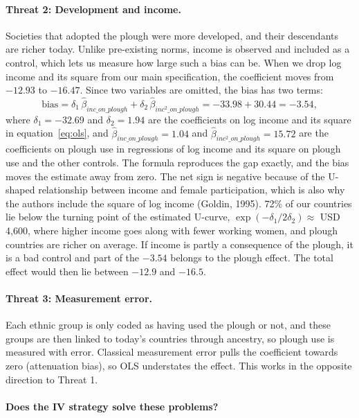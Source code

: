 \documentclass[12pt,a4paper]{article}
\begin{document}
\paragraph{Threat 2: Development and income.}

Societies that adopted the plough were more developed, and their descendants are richer today. Unlike pre-existing norms, income is observed and included as a control, which lets us measure how large such a bias can be. When we drop log income and its square from our main specification, the coefficient moves from $-12.93$ to $-16.47$. Since two variables are omitted, the bias has two terms:
\[
\text{bias} = \delta_1 \, \hat\beta_{inc\_on\_plough} + \delta_2 \, \hat\beta_{inc^2\_on\_plough} = -33.98 + 30.44 = -3.54 ,
\]
where $\delta_1 = -32.69$ and $\delta_2 = 1.94$ are the coefficients on log income and its square in equation~\eqref{eq:ols}, and $\hat\beta_{inc\_on\_plough} = 1.04$ and $\hat\beta_{inc^2\_on\_plough} = 15.72$ are the coefficients on plough use in regressions of log income and its square on plough use and the other controls. The formula reproduces the gap exactly, and the bias moves the estimate away from zero. The net sign is negative because of the U-shaped relationship between income and female participation, which is also why the authors include the square of log income (Goldin, 1995). 72\% of our countries lie below the turning point of the estimated U-curve, $\exp(-\delta_1 / 2\delta_2) \approx$ USD 4,600, where higher income goes along with fewer working women, and plough countries are richer on average. If income is partly a consequence of the plough, it is a bad control and part of the $-3.54$ belongs to the plough effect. The total effect would then lie between $-12.9$ and $-16.5$.

\paragraph{Threat 3: Measurement error.}

Each ethnic group is only coded as having used the plough or not, and these groups are then linked to today's countries through ancestry, so plough use is measured with error. Classical measurement error pulls the coefficient towards zero (attenuation bias), so OLS understates the effect. This works in the opposite direction to Threat 1.

\paragraph{Does the IV strategy solve these problems?}
\end{document}
